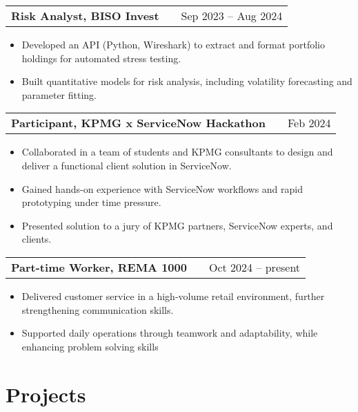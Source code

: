 \documentclass[a4paper,10pt]{article}
\makeatletter
\newenvironment{joblong}[2]
    {
    \begin{tabularx}{\linewidth}{@{}l X r@{}}
    \textbf{#1} & \hfill &  #2 \\[3.75pt]
    \end{tabularx}
    \begin{minipage}[t]{\linewidth}
    \begin{itemize}[nosep,after=\strut, leftmargin=1em, itemsep=3pt,label=--]
    }
    {
    \end{itemize}
    \end{minipage}
    }
\makeatother
\begin{document}
\begin{joblong}{Risk Analyst, BISO Invest}{Sep 2023 -- Aug 2024}
    \item Developed an API (Python, Wireshark) to extract and format portfolio holdings for automated stress testing.  
    \item Built quantitative models for risk analysis, including volatility forecasting and parameter fitting.  
\end{joblong}

\begin{joblong}{Participant, KPMG x ServiceNow Hackathon}{Feb 2024}
    \item Collaborated in a team of students and KPMG consultants to design and deliver a functional client solution in ServiceNow.  
    \item Gained hands-on experience with ServiceNow workflows and rapid prototyping under time pressure.  
    \item Presented solution to a jury of KPMG partners, ServiceNow experts, and clients.  
\end{joblong}

\begin{joblong}{Part-time Worker, REMA 1000}{Oct 2024 -- present}
    \item Delivered customer service in a high-volume retail environment, further strengthening communication skills.  
    \item Supported daily operations through teamwork and adaptability, while enhancing problem solving skills
\end{joblong}


  
\section{Projects}
\end{document}
